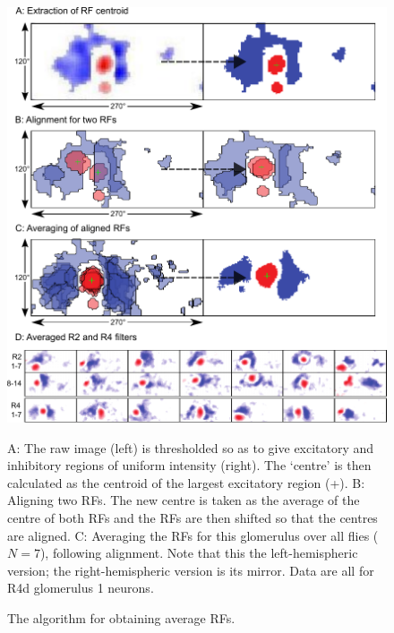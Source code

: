 \begin{figure}
\centering
\includegraphics{figures/avkernels}
\caption{The algorithm for obtaining average RFs.}{
A: The raw image (left) is thresholded so as to give excitatory and inhibitory regions of uniform intensity (right).
The `centre' is then calculated as the centroid of the largest excitatory region (+).
B: Aligning two RFs.
The new centre is taken as the average of the centre of both RFs and the RFs are then shifted so that the centres are aligned.
C: Averaging the RFs for this glomerulus over all flies ($N=7$), following alignment.
Note that this the left-hemispheric version; the right-hemispheric version is its mirror.
Data are all for R4d glomerulus 1 neurons.}
\label{fig:avkernels}
\end{figure}
